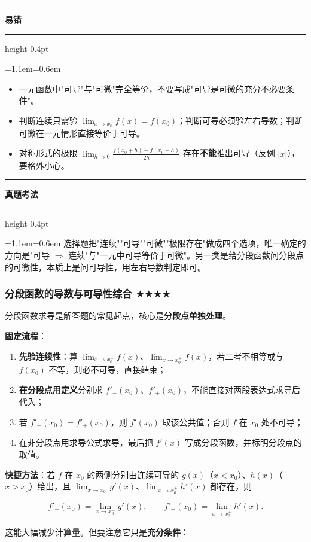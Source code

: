 \documentclass[11pt,openany,UTF8]{ctexbook}
\newcommand{\callouthead}[2]{%
  \par\addvspace{7pt}\noindent
  {\color{#1}\rule[-0.15em]{3pt}{1.05em}}\hspace{0.5em}%
  {\bfseries\color{#1}#2}\par\nobreak\vspace{-0.35em}%
  {\color{rulesep}\hrule height 0.4pt}\nobreak\vspace{0.45em}%
  \begingroup\small\setlength{\parindent}{0pt}%
  \leftskip=1.1em\rightskip=0.6em\noindent\ignorespaces}
\newcommand{\calloutend}{\par\endgroup\addvspace{7pt}}
\newenvironment{callwarn}[1]{\callouthead{warnbar}{#1}}{\calloutend}
\newenvironment{callexam}[1]{\callouthead{exambar}{#1}}{\calloutend}
\begin{document}
\begin{callwarn}{易错}
\begin{itemize}
\item 一元函数中"可导"与"可微"完全等价，不要写成"可导是可微的充分不必要条件"。
\item 判断连续只需验 $\lim_{x\to x_0}f(x)=f(x_0)$；判断可导必须验左右导数；判断可微在一元情形直接等价于可导。
\item 对称形式的极限 $\lim_{h\to 0}\frac{f(x_0+h)-f(x_0-h)}{2h}$ 存在\textbf{不能}推出可导（反例 $|x|$），要格外小心。
\end{itemize}
\end{callwarn}

\begin{callexam}{真题考法}
选择题把"连续""可导""可微""极限存在"做成四个选项，唯一确定的方向是"可导 $\Rightarrow$ 连续"与"一元中可导等价于可微"。另一类是给分段函数问分段点的可微性，本质上是问可导性，用左右导数判定即可。

\end{callexam}

\subsubsection{分段函数的导数与可导性综合 $\bigstar$$\bigstar$$\bigstar$$\bigstar$}

分段函数求导是解答题的常见起点，核心是\textbf{分段点单独处理}。

\textbf{固定流程}：

\begin{enumerate}
\item \textbf{先验连续性}：算 $\lim_{x\to x_0^-}f(x)$、$\lim_{x\to x_0^+}f(x)$，若二者不相等或与 $f(x_0)$ 不等，则必不可导，直接结束；
\item \textbf{在分段点用定义}分别求 $f'_-(x_0)$、$f'_+(x_0)$，不能直接对两段表达式求导后代入；
\item 若 $f'_-(x_0)=f'_+(x_0)$，则 $f'(x_0)$ 取该公共值；否则 $f$ 在 $x_0$ 处不可导；
\item 在非分段点用求导公式求导，最后把 $f'(x)$ 写成分段函数，并标明分段点的取值。
\end{enumerate}
\textbf{快捷方法}：若 $f$ 在 $x_0$ 的两侧分别由连续可导的 $g(x)$（$x<x_0$）、$h(x)$（$x>x_0$）给出，且 $\lim_{x\to x_0^-}g'(x)$、$\lim_{x\to x_0^+}h'(x)$ 都存在，则

\[f'_-(x_0)=\lim_{x\to x_0^-}g'(x),\qquad f'_+(x_0)=\lim_{x\to x_0^+}h'(x).\]

这能大幅减少计算量。但要注意它只是\textbf{充分条件}：
\end{document}
